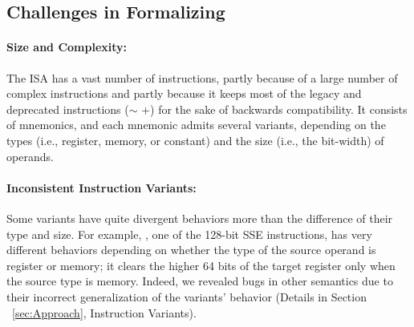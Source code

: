 



\subsection{Challenges in Formalizing \ISA}


\paragraph{Size and Complexity:}
%
The \ISA ISA has a vast number of instructions, partly because of a large number of complex instructions and partly because it keeps most of the legacy and deprecated instructions ($\sim$ \Xmmx{}+) for the sake of backwards compatibility.
It consists of \totalIntel{} mnemonics, and each mnemonic admits several variants, depending on the types (i.e., register, memory, or constant) and the size (i.e., the bit-width) of operands.

\paragraph{Inconsistent Instruction Variants:}
%
Some variants have quite divergent behaviors more than the difference of their type and size. For example, , one of the 128-bit SSE instructions, has very different behaviors depending on whether the type of the source operand is register or memory; it clears the higher 64 bits of the target register only when the source type is memory.
Indeed, we revealed bugs in other semantics due to their incorrect generalization of the variants' behavior (Details in Section ~\ref{sec:Approach}, Instruction Variants).

